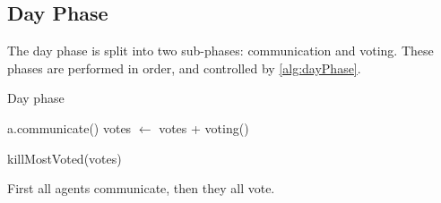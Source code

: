 \subsection{Day Phase}\label{sec:dayPhase}
The day phase is split into two sub-phases: communication and voting. These
phases are performed in order, and controlled by \cref{alg:dayPhase}.
\begin{algorithm}[H]
	\caption{Day phase}
	\begin{algorithmic}[1]
		\State a.communicate()
		\EndFor
		\State votes $\gets$ votes + voting()
		\EndFor

		\State killMostVoted(votes)
		\EndFunction
	\end{algorithmic}\label{alg:dayPhase}
\end{algorithm}
\setcounter{algorithmcaption}{1}
First all agents communicate, then they all vote.

